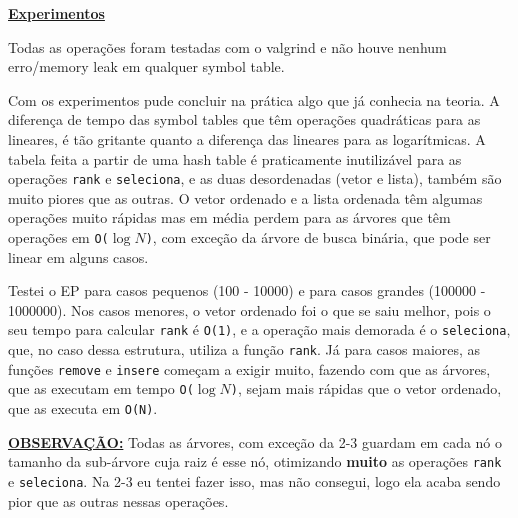 \documentclass[12pt]{article}
\newcommand{\mytitle}[1]{\textbf{\underline{#1}}}
\begin{document}
\mytitle{Experimentos}

Todas as operações foram testadas com o valgrind e não houve nenhum erro/memory leak em qualquer symbol table.

Com os  experimentos pude concluir na prática algo que já conhecia na teoria. A diferença de tempo das symbol tables que têm operações quadráticas para as lineares, é tão gritante quanto a diferença das lineares para as logarítmicas. A tabela feita a partir de uma hash table é praticamente inutilizável para as operações \texttt{rank} e \texttt{seleciona}, e as duas desordenadas (vetor e lista), também são muito piores que as outras. O vetor ordenado e a lista ordenada têm algumas operações muito rápidas mas em média perdem para as árvores que têm operações em \texttt{O($\log{N}$)}, com exceção da árvore de busca binária, que pode ser linear em alguns casos.

Testei o EP para casos pequenos (100 - 10000) e para casos grandes (100000 - 1000000). Nos casos menores, o vetor ordenado foi o que se saiu melhor, pois o seu tempo para calcular \texttt{rank} é \texttt{O(1)}, e a operação mais demorada é o \texttt{seleciona}, que, no caso dessa estrutura, utiliza a função \texttt{rank}. Já para casos maiores, as funções \texttt{remove} e \texttt{insere} começam a exigir muito, fazendo com que as árvores, que as executam em tempo \texttt{O($\log{N}$)}, sejam mais rápidas que o vetor ordenado, que as executa em \texttt{O(N)}.

\mytitle{OBSERVAÇÃO:} Todas as árvores, com exceção da 2-3 guardam em cada nó o tamanho da sub-árvore cuja raiz é esse nó, otimizando \textbf{muito} as operações \texttt{rank} e \texttt{seleciona}. Na 2-3 eu tentei fazer isso, mas não consegui, logo ela acaba sendo pior que as outras nessas operações.
\end{document}
